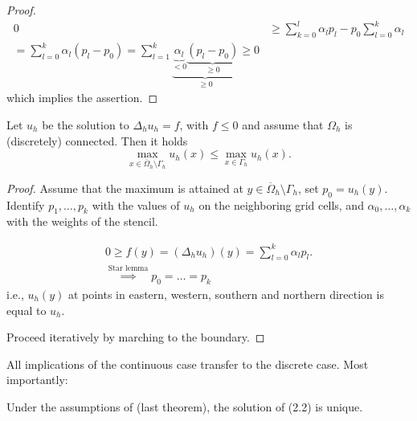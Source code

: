\begin{proof}
\begin{align*}
    0&\geq \sum_{k=0}^l \alpha_l p_l-p_0\sum_{l=0}^k\alpha_l\\
    =\sum_{l=0}^k \alpha_l(p_l-p_0)=\sum_{l=1}^k \underbrace{\underbrace{\alpha_l}_{< 0} \underbrace{(p_l-p_0)}_{\geq 0}}_{\geq 0} \geq 0
\end{align*}
which implies the assertion.    
\end{proof}

\begin{theorem}

    Let $u_h$ be the solution to $\Delta_h u_h=f$, with $f\leq 0$ and assume that $\Omega_h$ is (discretely) connected. Then it holds
    \[\max_{x\in \overline{\Omega}_h \setminus \Gamma_h} u_h(x)\leq \max_{x\in\Gamma_h} u_h(x).\]

\end{theorem}

\begin{proof}
    Assume that the maximum is attained at $y\in \overline{\Omega}_h \setminus \Gamma_h$, set $p_0=u_h(y)$. Identify $p_1,\dots,p_k$ with 
    the values of $u_h$ on the neighboring grid cells, and $\alpha_0,\dots,\alpha_k$ with the weights of the stencil.

    \begin{align*}
        0\geq f(y) = (\Delta_h u_h)(y) = \sum_{l=0}^k \alpha_l p_l.\\
        \stackrel{\text{Star lemma}}{\implies} p_0=\dots = p_k
    \end{align*}
    i.e., $u_h(y)$ at points in eastern, western, southern and northern direction is equal to $u_h$.

    Proceed iteratively by marching to the boundary.
\end{proof}

All implications of the continuous case transfer to the discrete case. Most importantly:
\begin{corollary}
    Under the assumptions of (last theorem), the solution of (2.2) is unique.
\end{corollary}




